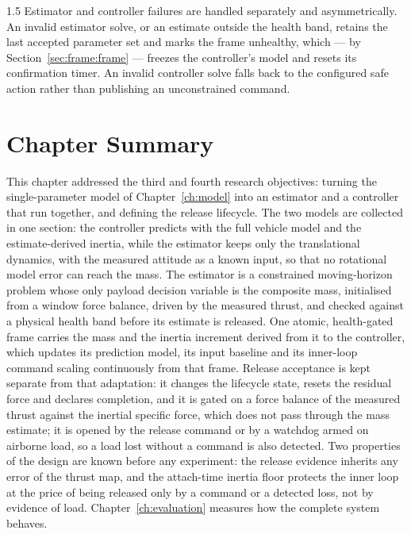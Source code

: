 \begin{spacing}{1.5}
Estimator and controller failures are handled separately and asymmetrically. An
invalid estimator solve, or an estimate outside the health band, retains the last
accepted parameter set and marks the frame unhealthy, which --- by Section~\ref{sec:frame:frame} --- freezes the
controller's model and resets its confirmation timer. An invalid controller solve
falls back to the configured safe action rather than publishing an unconstrained
command.

\section{Chapter Summary}\label{sec:frame:summary}

This chapter addressed the third and fourth research objectives: turning the
single-parameter model of Chapter~\ref{ch:model} into an estimator and a
controller that run together, and defining the release lifecycle. The two
models are collected in one section: the controller predicts with the full
vehicle model and the estimate-derived inertia, while the estimator keeps only
the translational dynamics, with the measured attitude as a known input, so that
no rotational model error can reach the mass. The estimator is a constrained
moving-horizon problem whose only payload decision variable is the composite
mass, initialised from a window force balance, driven by the measured thrust,
and checked against a physical health band before its estimate is released. One
atomic, health-gated frame carries the mass and the inertia increment derived
from it to the controller, which updates its prediction model, its input
baseline and its inner-loop command scaling continuously from that frame.
Release acceptance is kept separate from that adaptation: it changes the
lifecycle state, resets the residual force and declares completion, and it is
gated on a force balance of the measured thrust against the inertial specific
force, which does not pass through the mass estimate; it is opened by the
release command or by a watchdog armed on airborne load, so a load lost without a
command is also detected. Two properties of the design are known before any
experiment: the release evidence inherits any error of the thrust map, and the
attach-time inertia floor protects the inner loop at the price of being released
only by a command or a detected loss, not by evidence of load.
Chapter~\ref{ch:evaluation} measures how the complete system behaves.

\end{spacing}
\newpage
